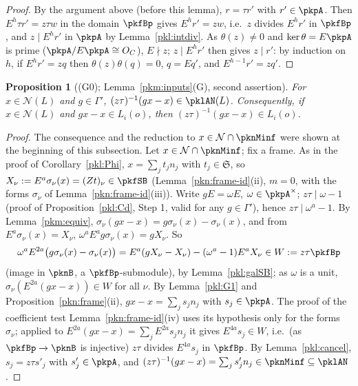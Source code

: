 \documentclass[10pt]{amsart}
\newtheorem{proposition}[theorem]{Proposition}
\theoremstyle{definition}
\theoremstyle{remark}
\begin{document}
\begin{proof}
By the argument above (before this lemma), $r=\tau r'$ with $r'\in\pkpA$. Then $E^h\tau r'=z\tau w$ in the domain $\pkfBp$
gives $E^hr'=zw$, i.e.\ $z$ divides $E^hr'$ in $\pkfBp$, and $z\mid E^hr'$ in $\pkpA$ by Lemma~\ref{pkl:intdiv}. As
$\theta(z)\ne0$ and $\ker\theta=E\pkpA$ is prime ($\pkpA/E\pkpA\cong O_C$), $E\nmid z$; $z\mid E^hr'$ then gives
$z\mid r'$: by induction on $h$, if $E^hr'=zq$ then $\theta(z)\theta(q)=0$, $q=Eq'$, and $E^{h-1}r'=zq'$.
\end{proof}

\begin{proposition}[(G0); Lemma~\ref{pkm:inputs}(G), second assertion]\label{pkl:G0}
For $x\in\mathcal N(L)$ and $g\in\Gamma'$, $(z\tau)^{-1}(gx-x)\in\pklAN(L)$. Consequently, if $x\in\mathcal N(L)$ and
$gx-x\in L_i(o)$, then $(z\tau)^{-1}(gx-x)\in L_i(o)$.
\end{proposition}

\begin{proof}
The consequence and the reduction to $x\in\mathcal N\cap\pknMinf$ were shown at the beginning of this subsection. Let
$x\in\mathcal N\cap\pknMinf$; fix a frame. As in the proof of Corollary~\ref{pkl:Phi}, $x=\sum_jt_jn_j$ with
$t_j\in\mathfrak S$, so $X_\nu:=E^a\sigma_\nu(x)=(Zt)_\nu\in\pkfSB$ (Lemma~\ref{pkn:frame-id}(ii), $m=0$, with the forms
$\sigma_\nu$ of Lemma~\ref{pkn:frame-id}(iii)). Write $gE=\omega E$, $\omega\in\pkpA^\times$; $z\tau\mid\omega-1$ (proof of
Proposition~\ref{pkl:Cd}, Step 1, valid for any $g\in\Gamma'$), hence $z\tau\mid\omega^a-1$. By Lemma~\ref{pkm:equiv},
$\sigma_\nu(gx-x)=g\sigma_\nu(x)-\sigma_\nu(x)$, and from $E^a\sigma_\nu(x)=X_\nu$, $\omega^aE^ag\sigma_\nu(x)=gX_\nu$. So
\[
\omega^aE^{2a}\bigl(g\sigma_\nu(x)-\sigma_\nu(x)\bigr)=E^a(gX_\nu-X_\nu)-(\omega^a-1)E^aX_\nu\in W:=z\tau\pkfBp
\]
(image in $\pknB$, a $\pkfBp$-submodule), by Lemma~\ref{pkl:galSB}; as $\omega$ is a unit, $\sigma_\nu(E^{2a}(gx-x))\in W$ for
all $\nu$. By Lemma~\ref{pkl:G1} and Proposition~\ref{pkn:frame}(ii), $gx-x=\sum_js_jn_j$ with $s_j\in\pkpA$. The proof of
the coefficient test Lemma~\ref{pkn:frame-id}(iv) uses its hypothesis only for the forms $\sigma_\nu$; applied to
$E^{2a}(gx-x)=\sum_jE^{2a}s_jn_j$ it gives $E^{4a}s_j\in W$, i.e.\ (as $\pkfBp\to\pknB$ is injective) $z\tau$ divides
$E^{4a}s_j$ in $\pkfBp$. By Lemma~\ref{pkl:cancel}, $s_j=z\tau s'_j$ with $s'_j\in\pkpA$, and $(z\tau)^{-1}(gx-x)=\sum_js'_jn_j\in
\pknMinf\subseteq\pklAN$.
\end{proof}
\end{document}
